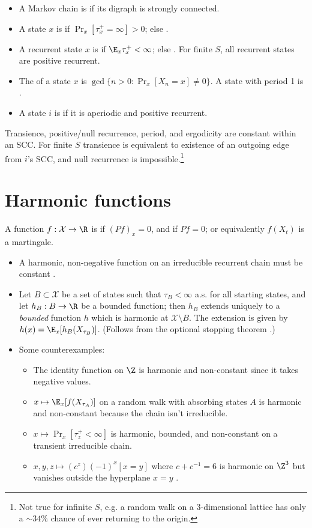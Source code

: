 \documentclass[11pt,a4paper]{article}
\newcommand*{\XX}{\mathcal{X}}
\begin{document}
\begin{itemize}
\item A Markov chain is  if its digraph is strongly connected.
\item A state $x$ is  if $\Pr_x[\tau_x^+ = \infty] > 0$; else .
\item A recurrent state $x$ is  if $\E_x \tau_x^+ < \infty$; else .  For finite $S$, all recurrent states are positive recurrent.
\item The  of a state $x$ is $\gcd\{n > 0 : \Pr_x[X_n = x] \ne 0\}$.  A state with period 1 is .
\item A state $i$ is  if it is aperiodic and positive recurrent.
\end{itemize}

Transience, positive/null recurrence, period, and ergodicity are constant within an SCC.
For finite $S$ transience is equivalent to existence of an outgoing edge from $i$'s SCC, and null recurrence is impossible.\footnote{Not true for infinite $S$, e.g. a random walk on a 3-dimensional lattice has only a ${\sim}34\%$ chance of ever returning to the origin.}

\section*{Harmonic functions}

A function $f : \XX \to \R$ is  if $(Pf)_x = 0$, and  if $Pf = 0$; or equivalently $f(X_t)$ is a martingale.

\begin{itemize}
\item A harmonic, non-negative function on an irreducible recurrent chain must be constant \cite[]{LevinPeres}.  
\item Let $B \subset \XX$ be a set of states such that $\tau_B < \infty$ a.s. for all starting states, and let $h_B : B \to \R$ be a bounded function; then $h_B$ extends uniquely to a \emph{bounded} function $h$ which is harmonic at $\XX \setminus B$.  The extension is given by $h(x) = \E_x[h_B(X_{\tau_B})]$.  (Follows from the optional stopping theorem \cite[]{LevinPeres}.)
\item Some counterexamples:
  \begin{itemize}
  \item The identity function on $\Z$ is harmonic and non-constant since it takes negative values.
  \item $x \mapsto \E_x[f(X_{\tau_A})]$ on a random walk with absorbing states $A$ is harmonic and non-constant because the chain isn't irreducible.
  \item $x \mapsto \Pr_x[\tau_z^+ < \infty]$ is harmonic, bounded, and non-constant on a transient irreducible chain.
  \item $x, y, z \mapsto (c^z)(-1)^x[x=y]$ where $c + c^{-1} = 6$ is harmonic on $\Z^3$ but vanishes outside the hyperplane $x=y$ \cite[Remark~1.3]{BLMS2017}.
  \end{itemize}
\end{itemize}
\end{document}

